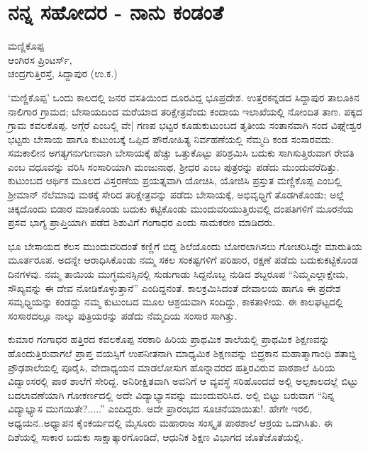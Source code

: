 {\fontsize{14}{16}\selectfont
\chapter{ನನ್ನ  ಸಹೋದರ - ನಾನು ಕಂಡಂತೆ}

\begin{center}
\smallskip

ಮಣ್ಣಿಕೊಪ್ಪ\\
ಆಂಗಿರಸ ಪ್ರಿಂಟರ್ಸ್,\\
ಚಂದ್ರಗುತ್ತಿರಸ್ತೆ, ಸಿದ್ದಾಪುರ  (ಉ.ಕ.)
\addrule
\end{center}
`ಮಣ್ಣಿಕೊಪ್ಪ'  ಒಂದು ಕಾಲದಲ್ಲಿ ಜನರ ವಸತಿಯಿಂದ ದೂರವಿದ್ದ ಭೂಪ್ರದೇಶ. ಉತ್ತರಕನ್ನಡದ ಸಿದ್ದಾಪುರ ತಾಲೂಕಿನ  ನಾಲಿಗಾರ ಗ್ರಾಮದ; ಬೇಸಾಯದಿಂದ ಮರೆಯಾದ ತರಿಕ್ಷೇತ್ರವೆಂದು ಕಂದಾಯ ಇಲಾಖೆಯಲ್ಲಿ ನೋಂದಿತ ತಾಣ.  ಪಕ್ಕದ ಗ್ರಾಮ ಕವಲಕೊಪ್ಪ. ಅಗ್ಗೆರೆ ಎಂಬಲ್ಲಿ ವೇ| ಗಣಪ ಭಟ್ಟರ ಕೂಡುಕುಟುಂಬದ ತೃತೀಯ ಸಂತಾನವಾಗಿ ಸಂದ ವಿಘ್ನೇಶ್ವರ ಭಟ್ಟರು ಬೇಸಾಯ ಹಾಗೂ ಕುಟುಂಬಕ್ಕೆ ಒಪ್ಪಿದ ಪೌರೋಹಿತ್ಯ ನಿರ್ವಹಣೆಯಲ್ಲಿ ನೆಮ್ಮದಿ ಕಂಡ ಸಂಸಾರವದು.  ಸಮಕಾಲೀನ ಅಗತ್ಯಗನುಗುಣವಾಗಿ ಬೇಸಾಯಕ್ಕೆ ಹೆಚ್ಚು ಒತ್ತುಕೊಟ್ಟು ಪರಿಶ್ರಮಿಸಿ ಬದುಕು ಸಾಗಿಸುತ್ತಿರುವಾಗ ರೇವತಿ ಎಂಬ ವಧೂವನ್ನು ವರಿಸಿ ಸಂಸಾರಿಯಾಗಿ ಮಂಜುನಾಥ, ಶ್ರೀಧರ ಎಂಬ ಪುತ್ರರನ್ನು  ಪಡೆದು  ಮುಂದುವರೆದಿತ್ತು.  ಕುಟುಂಬದ ಆರ್ಥಿಕ ಮೂಲದ ವಿಸ್ತರಣೆಯ  ಪ್ರಯತ್ನವಾಗಿ  ಯೋಚಿಸಿ, ಯೋಜಿಸಿ  ಪ್ರಸ್ತುತ ಮಣ್ಣಿಕೊಪ್ಪ ಎಂಬಲ್ಲಿ ಶ್ರೀಮಾನ್ ನೆಲೆಮಾವು  ಮಠಕ್ಕೆ ಸೇರಿದ ತರಿಕ್ಷೇತ್ರವನ್ನು  ಪಡೆದು ಬೇಸಾಯಕ್ಕೆ,  ಅಭಿವೃಧ್ಧಿಗೆ ತೊಡಗಿಕೊಂಡು;  ಅಲ್ಲೆ ಚಿಕ್ಕದೊಂದು ಬಿಡಾರ ಮಾಡಿಕೊಂಡು ಬದುಕು ಕಟ್ಟಿಕೊಂಡು ಮುಂದುವರಿಯುತ್ತಿರುವಲ್ಲಿ  ದಂಪತಿಗಳಿಗೆ ಮೂರನೆಯ ಪ್ರಸವ ಭಾಗ್ಯ ಪ್ರಾಪ್ತಿಯಾಗಿ ಪಡೆದ ಶಿಶುವಿಗೆ  ಗಂಗಾಧರ ಎಂದು ನಾಮಕರಣ ಮಾಡಿದರು.

ಭೂ ಬೇಸಾಯದ ಕೆಲಸ ಮುಂದುವರಿದಂತೆ ಕಣ್ಣಿಗೆ ಬಿದ್ದ  ಶಿಲೆಯೊಂದು ಬೋರಲಾಗಿಸಲು ಗೋಚರಿಸಿದ್ದೇ  ಮಾರುತಿಯ  ಮೂರ್ತರೂಪ.  ಅದನ್ನೇ ಆರಾಧಿಸಿಕೊಂಡು  ನಮ್ಮ ಸಕಲ ಸಂಕಷ್ಟಗಳಿಗೆ ಪರಿಹಾರ, ರಕ್ಷಣೆ ಪಡೆದು ಬದುಕುಕಟ್ಟಿಕೊಂಡ ದಿನಗಳವು. ನಮ್ಮ ತಾಯಿಯ ಮುಗ್ಧಮನಸ್ಸಿನಲ್ಲಿ ಸುಡುಗಾಡು ಸಿದ್ದನೊಬ್ಬ ನುಡಿದ ಶಬ್ದರೂಪ ``ನಿಮ್ಮಎಲ್ಲಾಕ್ಷೇಮ, ಸೌಖ್ಯವನ್ನು ಈ ದೇವ ನೋಡಿಕೊಳ್ಳುತ್ತಾನೆ'' ಎಂದಿದ್ದನಂತೆ.  ಕಾಲಕ್ರಮಿಸಿದಂತೆ   ದೇವಾಲಯ ಹಾಗೂ  ಈ ಪ್ರದೇಶ  ಸಮೃಧ್ಧಿಯನ್ನು ಕಂಡದ್ದು ನಮ್ಮ ಕುಟುಂಬದ ಮೂಲ ಆಶ್ರಯವಾಗಿ ಸಂದಿದ್ದು, ಕಾಕತಾಳೀಯ. ಈ ಕಾಲಘಟ್ಟದಲ್ಲಿ  ಸಂಸಾರದಲ್ಲೂ ನಾಲ್ಕು ಪುತ್ರಿಯರನ್ನು  ಪಡೆದು ನೆಮ್ಮದಿಯ ಸಂಸಾರ ಸಾಗಿತ್ತು.	
	
ಕುಮಾರ ಗಂಗಾಧರ ಹತ್ತಿರದ ಕವಲಕೊಪ್ಪ ಸರಕಾರಿ ಹಿರಿಯ ಪ್ರಾಥಮಿಕ ಶಾಲೆಯಲ್ಲಿ ಪ್ರಾಥಮಿಕ ಶಿಕ್ಷಣವನ್ನು ಹೊಂದುತ್ತಿರುವಾಗಲೆ ಪ್ರಾಪ್ತ ವಯಸ್ಸಿಗೆ ಉಪನೀತನಾಗಿ  ಮಾಧ್ಯಮಿಕ ಶಿಕ್ಷಣವನ್ನು ಬಿದ್ರ್ರಕಾನ ಮಹಾತ್ಮಾಗಾಂಧಿ ಶತಾಬ್ದಿ ಪ್ರೌಢಶಾಲೆಯಲ್ಲಿ ಪೂರೈಸಿ, ವೇದಾಧ್ಯಯನ ಮಾಡಲೋಸುಗ ಹೊನ್ನಾವರದ ಹತ್ತಿರವಿರುವ ಪಾಠಶಾಲೆ ಹಿರಿಯ ವಿದ್ವಾಂಸರಲ್ಲಿ ಪಾಠ ಶಾಲೆಗೆ ಸೇರಿದ್ದ.  ಅನಿರೀಕ್ಷಿತವಾಗಿ ಅವನಿಗೆ ಆ ವ್ಯವಸ್ಥೆ ಸರಿಹೊಂದದೆ ಅಲ್ಲಿ ಅಲ್ಪಕಾಲದಲ್ಲೆ ಬಿಟ್ಟು ಬದಲಾವಣೆಯಾಗಿ ಗೋಕರ್ಣದಲ್ಲಿ ಅದೇ ವಿದ್ಯಾಭ್ಯಾಸವನ್ನು ಮುಂದುವರಿಸಿದ. ಅಲ್ಲಿ ಬಿಟ್ಟು  ಬರುವಾಗ ``ನಿನ್ನ ವಿದ್ಯಾಭ್ಯಾಸ ಮುಗಯಿತೇ?.....'' ಎಂದಿದ್ದರು. ಅದೇ ಪ್ರಾರಂಭದ  ಸೂಚನೆಯಾಯಿತು!.  ಹೇಗೇ ಇರಲಿ, ಅಧ್ಯಯನ..ಅಧ್ಯಾಪನ ಕೈಂಕರ್ಯದಲ್ಲಿ  ಮೈಸೂರು ಮಹಾರಾಜ ಸಂಸ್ಕೃತ ಪಾಠಶಾಲೆ ಆಶ್ರಯ ಒದಗಿಸಿತು. ಈ ದಿಶೆಯಲ್ಲಿ  ಸಾಕಾರ  ಬದುಕು ಸಾಕ್ಷಾತ್ಕಾರಗೊಂಡಿದೆ, ಆಧುನಿಕ ಶಿಕ್ಷಣ ವಿಭಾಗದ ಜೊತೆಜೊತೆಯಲ್ಲಿ.

}
